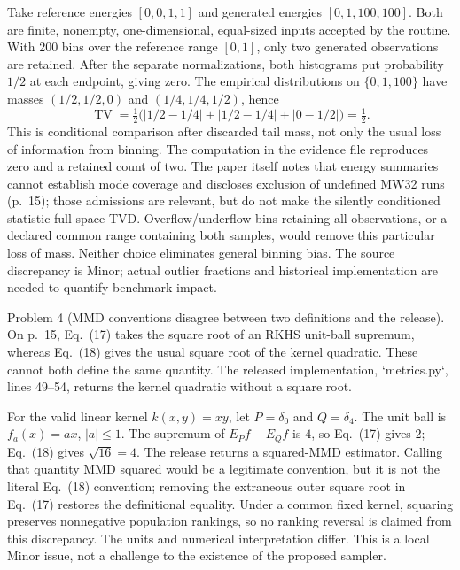 \documentclass[10pt]{article}
\begin{document}
Take reference energies \([0,0,1,1]\) and generated energies \([0,1,100,100]\). Both are finite, nonempty, one-dimensional, equal-sized inputs accepted by the routine. With 200 bins over the reference range \([0,1]\), only two generated observations are retained. After the separate normalizations, both histograms put probability \(1/2\) at each endpoint, giving zero. The empirical distributions on \(\{0,1,100\}\) have masses \((1/2,1/2,0)\) and \((1/4,1/4,1/2)\), hence \[\operatorname{TV}=\tfrac12\bigl(|1/2-1/4|+|1/2-1/4|+|0-1/2|\bigr)=\tfrac12.\] This is conditional comparison after discarded tail mass, not only the usual loss of information from binning. The computation in the evidence file reproduces zero and a retained count of two. The paper itself notes that energy summaries cannot establish mode coverage and discloses exclusion of undefined MW32 runs (p. 15); those admissions are relevant, but do not make the silently conditioned statistic full-space TVD. Overflow/underflow bins retaining all observations, or a declared common range containing both samples, would remove this particular loss of mass. Neither choice eliminates general binning bias. The source discrepancy is Minor; actual outlier fractions and historical implementation are needed to quantify benchmark impact.\par
Problem 4 (MMD conventions disagree between two definitions and the release).  On p. 15, Eq. (17) takes the square root of an RKHS unit-ball supremum, whereas Eq. (18) gives the usual square root of the kernel quadratic. These cannot both define the same quantity. The released implementation, `metrics.py`, lines 49–54, returns the kernel quadratic without a square root.\par
For the valid linear kernel \(k(x,y)=xy\), let \(P=\delta_0\) and \(Q=\delta_4\). The unit ball is \(f_a(x)=ax\), \(|a|\leq1\). The supremum of \(E_Pf-E_Qf\) is \(4\), so Eq. (17) gives \(2\); Eq. (18) gives \(\sqrt{16}=4\). The release returns a squared-MMD estimator. Calling that quantity MMD squared would be a legitimate convention, but it is not the literal Eq. (18) convention; removing the extraneous outer square root in Eq. (17) restores the definitional equality. Under a common fixed kernel, squaring preserves nonnegative population rankings, so no ranking reversal is claimed from this discrepancy. The units and numerical interpretation differ. This is a local Minor issue, not a challenge to the existence of the proposed sampler.\par
\end{document}
